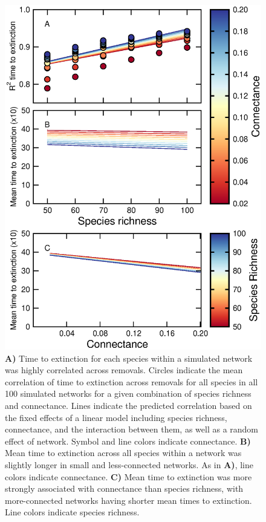 \documentclass[12pt]{article}
\begin{document}
		\begin{figure}[hb!]
		    \centering
			\includegraphics[height=.75\textheight]{figures/extinction_order/extorder_correlations.eps}
			\caption{\textbf{A)} Time to extinction for each species within a simulated network was highly correlated across removals. Circles indicate the mean correlation of time to extinction across removals for all species in all 100 simulated networks for a given combination of species richness and connectance. Lines indicate the predicted correlation based on the fixed effects of a linear model including species richness, connectance, and the interaction between them, as well as a random effect of network. Symbol and line colors indicate connectance. \textbf{B)} Mean time to extinction across all species within a network was slightly longer in small and less-connected networks. As in \textbf{A)}, line colors indicate connectance. \textbf{C)} Mean time to extinction was more strongly associated with connectance than species richness, with more-connected networks having shorter mean times to extinction. Line colors indicate species richness.}
			\label{extorder_corrs}
			\end{figure}		
\end{document}
